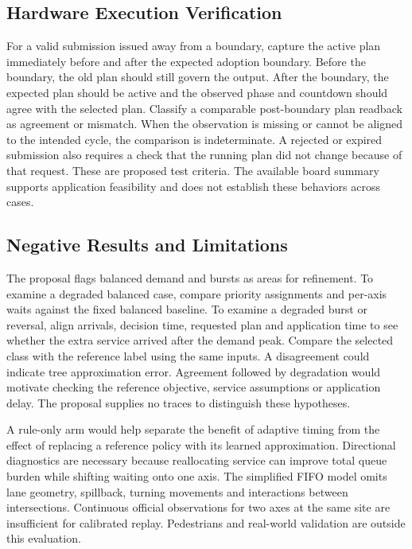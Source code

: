 \subsection{Hardware Execution Verification}
For a valid submission issued away from a boundary, capture the active plan immediately before and after the expected adoption boundary. Before the boundary, the old plan should still govern the output. After the boundary, the expected plan should be active and the observed phase and countdown should agree with the selected plan. Classify a comparable post-boundary plan readback as agreement or mismatch. When the observation is missing or cannot be aligned to the intended cycle, the comparison is indeterminate. A rejected or expired submission also requires a check that the running plan did not change because of that request. These are proposed test criteria. The available board summary supports application feasibility and does not establish these behaviors across cases.

\subsection{Negative Results and Limitations}
The proposal flags balanced demand and bursts as areas for refinement. To examine a degraded balanced case, compare priority assignments and per-axis waits against the fixed balanced baseline. To examine a degraded burst or reversal, align arrivals, decision time, requested plan and application time to see whether the extra service arrived after the demand peak. Compare the selected class with the reference label using the same inputs. A disagreement could indicate tree approximation error. Agreement followed by degradation would motivate checking the reference objective, service assumptions or application delay. The proposal supplies no traces to distinguish these hypotheses.

A rule-only arm would help separate the benefit of adaptive timing from the effect of replacing a reference policy with its learned approximation. Directional diagnostics are necessary because reallocating service can improve total queue burden while shifting waiting onto one axis. The simplified FIFO model omits lane geometry, spillback, turning movements and interactions between intersections. Continuous official observations for two axes at the same site are insufficient for calibrated replay. Pedestrians and real-world validation are outside this evaluation.

